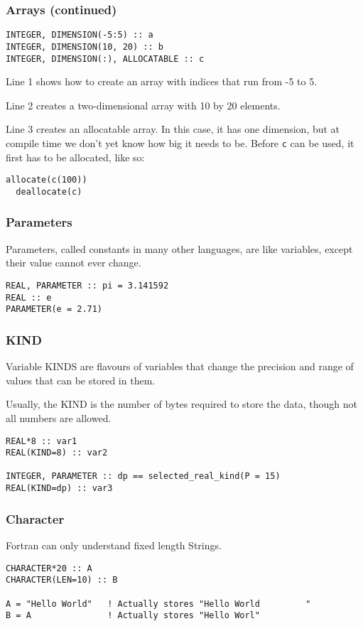 \begin{frame}[fragile]
  \frametitle{Arrays (continued)}
  \begin{lstlisting}
INTEGER, DIMENSION(-5:5) :: a
INTEGER, DIMENSION(10, 20) :: b
INTEGER, DIMENSION(:), ALLOCATABLE :: c
  \end{lstlisting}

  Line 1 shows how to create an array with indices that run from -5 to 5.

  Line 2 creates a two-dimensional array with 10 by 20 elements.

  Line 3 creates an allocatable array. In this case, it has one dimension, 
  but at compile time we don't yet know how big it needs to be.
  Before \texttt{c} can be used, it first has to be allocated, like so:

  \begin{lstlisting}[numbers=none]
  allocate(c(100))
  deallocate(c)
  \end{lstlisting}

\end{frame}

\begin{frame}[fragile]
  \frametitle{Parameters}
  Parameters, called constants in many other languages, are like variables, except
  their value cannot ever change.

  \begin{lstlisting}
REAL, PARAMETER :: pi = 3.141592
REAL :: e
PARAMETER(e = 2.71)
  \end{lstlisting}
\end{frame}

\begin{frame}[fragile]
  \frametitle{KIND}
  Variable KINDS are flavours of variables that change the precision and range of 
  values that can be stored in them.

  Usually, the KIND is the number of bytes required to store the data, though not all numbers are allowed.

  \begin{lstlisting}
REAL*8 :: var1
REAL(KIND=8) :: var2

INTEGER, PARAMETER :: dp == selected_real_kind(P = 15)
REAL(KIND=dp) :: var3
  \end{lstlisting}
\end{frame}

\begin{frame}[fragile]
  \frametitle{Character}

  Fortran can only understand fixed length Strings. 
  
  \begin{lstlisting}
CHARACTER*20 :: A
CHARACTER(LEN=10) :: B

A = "Hello World"   ! Actually stores "Hello World         "
B = A               ! Actually stores "Hello Worl"
  \end{lstlisting}

\end{frame}

